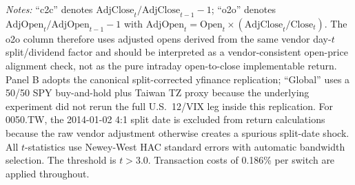 \begin{table}[H]
\centering
\caption{Time-Zone Momentum Strategy Performance: Close-to-Close vs.\ Open-to-Open}
\label{tab:tz_results}
\begin{flushleft}
\small \textit{Notes:} ``c2c'' denotes $\text{AdjClose}_t / \text{AdjClose}_{t-1} - 1$; ``o2o'' denotes $\text{AdjOpen}_t / \text{AdjOpen}_{t-1} - 1$ with $\text{AdjOpen}_t = \text{Open}_t \times (\text{AdjClose}_t/\text{Close}_t)$. The o2o column therefore uses adjusted opens derived from the same vendor day-$t$ split/dividend factor and should be interpreted as a vendor-consistent open-price alignment check, not as the pure intraday open-to-close implementable return. Panel B adopts the canonical split-corrected yfinance replication; ``Global'' uses a 50/50 SPY buy-and-hold plus Taiwan TZ proxy because the underlying experiment did not rerun the full U.S.\ 12/VIX leg inside this replication. For 0050.TW, the 2014-01-02 4:1 split date is excluded from return calculations because the raw vendor adjustment otherwise creates a spurious split-date shock. All $t$-statistics use Newey-West HAC standard errors with automatic bandwidth selection. The \citet{harvey2016} threshold is $t > 3.0$. Transaction costs of 0.186\% per switch are applied throughout.
\end{flushleft}
\end{table}

